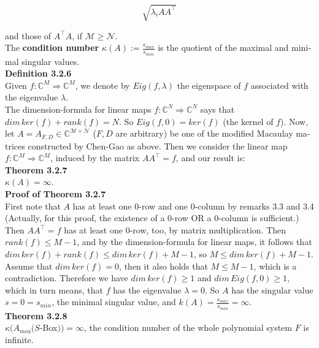 \documentclass[a4paper,11pt]{article}
\begin{document}
\begin{otherlanguage}{english}
$$\sqrt{\lambda_i AA^\intercal}$$

\noindent
and those of $A^\intercal A$, if $\mathcal{M} \geq \mathcal{N}$. \\

\noindent
The \textbf{condition number} $\kappa(A) := \frac{s_{max}}{s_{min}}$ is the quotient of the maximal and minimal singular values. \\

\noindent
\textbf{Definition 3.2.6} \\
Given $f: \mathbb{C}^M \Rightarrow \mathbb{C}^M$, we denote by $Eig(f,\lambda)$ the eigenspace of $f$ associated with the eigenvalue $\lambda$. \\

\noindent
The dimension-formula for linear maps $f: \mathbb{C}^N \Rightarrow \mathbb{C}^N$ says that $dim \, ker(f) + rank(f) = N$. So $Eig(f,0) = ker(f)$ (the kernel of $f$). Now, let $A = A_{F,D} \in \mathbb{C}^{\mathcal{M} \times \mathcal{N}}$ ($F,D$ are arbitrary) be one of the modified Macaulay matrices constructed by Chen-Gao as above. Then we consider the linear map $f: \mathbb{C}^M \Rightarrow \mathbb{C}^M$, induced by the matrix $AA^\intercal = f$, and our result is: \\

\noindent
\textbf{Theorem 3.2.7} \\
$\kappa(A)=\infty$. \\

\noindent
\textbf{Proof of Theorem 3.2.7} \\
First note that $A$ has at least one $0$-row and one $0$-column by remarks 3.3 and 3.4 (Actually, for this proof, the existence of a $0$-row OR a $0$-column is sufficient.) Then $AA^\intercal = f$ has at least one $0$-row, too, by matrix multiplication. Then $rank(f) \leq M-1$, and by the dimension-formula for linear maps, it follows that $dim \,ker(f) + rank(f) \leq dim \,ker(f) + M-1$, so $M \leq dim \,ker(f) + M-1$.\\
Assume that $dim \,ker(f) = 0$, then it also holds that $M \leq M-1$, which is a contradiction. Therefore we have $dim \,ker(f) \geq 1$ and  $dim \,Eig(f,0) \geq 1$, 
which in turn means, that $f$ has the eigenvalue $\lambda = 0$. So $A$ has the singular value $s = 0 = s_{min}$, the minimal singular value, and
$k(A) = \frac{s_{max}}{s_{min}} = \infty$. \\

\noindent
\textbf{Theorem 3.2.8} \\
$\kappa(A_{mca}(S$-Box$))=\infty$, the condition number of the whole polynomial system $F$ is infinite. \\


\end{otherlanguage}
\end{document}
